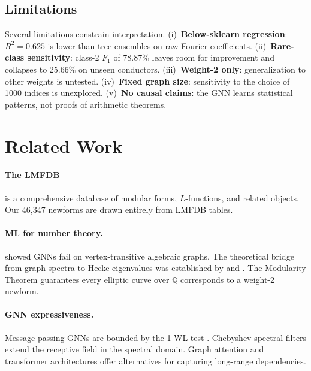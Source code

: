 \documentclass[11pt]{article}
\newcommand{\Q}{\mathbb{Q}}
\begin{document}
\subsection{Limitations}

Several limitations constrain interpretation. (i)~\textbf{Below-sklearn regression}: $R^2 = 0.625$ is lower than tree ensembles on raw Fourier coefficients. (ii)~\textbf{Rare-class sensitivity}: class-2 $F_1$ of 78.87\% leaves room for improvement and collapses to 25.66\% on unseen conductors. (iii)~\textbf{Weight-2 only}: generalization to other weights is untested. (iv)~\textbf{Fixed graph size}: sensitivity to the choice of 1000 indices is unexplored. (v)~\textbf{No causal claims}: the GNN learns statistical patterns, not proofs of arithmetic theorems.

\section{Related Work}
\label{sec:related}

\paragraph{The LMFDB \citep{lmfdb2023}} is a comprehensive database of modular forms, $L$-functions, and related objects. Our 46,347 newforms are drawn entirely from LMFDB tables.

\paragraph{ML for number theory.}
\citet{companion2025} showed GNNs fail on vertex-transitive algebraic graphs. The theoretical bridge from graph spectra to Hecke eigenvalues was established by \citet{lps1988} and \citet{pizer1990}. The Modularity Theorem \citep{breuil2001, wiles1995} guarantees every elliptic curve over $\Q$ corresponds to a weight-2 newform.

\paragraph{GNN expressiveness.}
Message-passing GNNs are bounded by the 1-WL test \citep{xu2019powerful}. Chebyshev spectral filters \citep{defferrard2016cheb} extend the receptive field in the spectral domain. Graph attention \citep{velickovic2018gat} and transformer \citep{dwivedi2022} architectures offer alternatives for capturing long-range dependencies.
\end{document}
